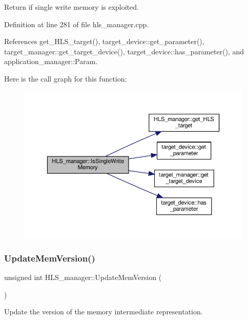 Return if single write memory is exploited. 



Definition at line 281 of file hls\+\_\+manager.\+cpp.



References get\+\_\+\+H\+L\+S\+\_\+target(), target\+\_\+device\+::get\+\_\+parameter(), target\+\_\+manager\+::get\+\_\+target\+\_\+device(), target\+\_\+device\+::has\+\_\+parameter(), and application\+\_\+manager\+::\+Param.

Here is the call graph for this function\+:
\nopagebreak
\begin{figure}[H]
\begin{center}
\leavevmode
\includegraphics[width=350pt]{dc/dd7/classHLS__manager_a022c7d48031f428b5814d0493ac46d1e_cgraph}
\end{center}
\end{figure}
\mbox{\label{classHLS__manager_a7503f3dcbbb837cd94ad7052bdfb189a}} 
\subsubsection{\texorpdfstring{Update\+Mem\+Version()}{UpdateMemVersion()}}
{\footnotesize\ttfamily unsigned int H\+L\+S\+\_\+manager\+::\+Update\+Mem\+Version (\begin{DoxyParamCaption}{ }\end{DoxyParamCaption})}



Update the version of the memory intermediate representation. 

